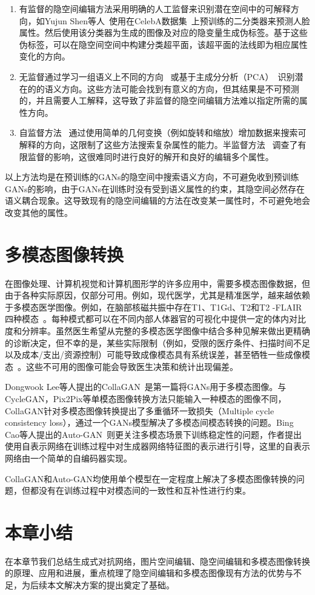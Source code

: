 \begin{enumerate}
\item 有监督的隐空间编辑方法采用明确的人工监督来识别潜在空间中的可解释方向，如Yujun Shen等人~\cite{interfacegan}使用在CelebA数据集~\cite{CelebA}上预训练的二分类器来预测人脸属性。然后使用该分类器为生成的图像及对应的隐变量生成伪标签。基于这些伪标签，可以在隐空间空间中构建分类超平面，该超平面的法线即为相应属性变化的方向。

\item 无监督通过学习一组语义上不同的方向~\cite{icml2020} 或基于主成分分析（PCA）~\cite{harkonen2020ganspace}识别潜在的的语义方向。这些方法可能会找到有意义的方向，但其结果是不可预测的，并且需要人工解释，这导致了非监督的隐空间编辑方法难以指定所需的属性方向。

\item 自监督方法~\cite{steer,variation} 通过使用简单的几何变换（例如旋转和缩放）增加数据来搜索可解释的方向，这限制了这些方法搜索复杂属性的能力。半监督方法~\cite{nie2020semi} 调查了有限监督的影响，这很难同时进行良好的解开和良好的编辑多个属性。
\end{enumerate}

以上方法均是在预训练的GANs的隐空间中搜索语义方向，不可避免收到预训练GANs的影响，由于GANs在训练时没有受到语义属性的约束，其隐空间必然存在语义耦合现象。这导致现有的隐空间编辑的方法在改变某一属性时，不可避免地会改变其他的属性。    

\section{多模态图像转换}

在图像处理、计算机视觉和计算机图形学的许多应用中，需要多模态图像数据，但由于各种实际原因，仅部分可用。例如，现代医学，尤其是精准医学，越来越依赖于多模态医学图像。例如，在脑部核磁共振中存在T1、T1Gd、T2和T2 -FLAIR四种模态~\cite{drevelegas2011imaging}。每种模式都可以在不同内部人体器官的可视化中提供一定的体内对比度和分辨率。虽然医生希望从完整的多模态医学图像中结合多种见解来做出更精确的诊断决定，但不幸的是，某些实际限制（例如，受限的医疗条件、扫描时间不足以及成本/支出/资源控制）可能导致成像模态具有系统误差，甚至牺牲一些成像模态~\cite{tanenbaum2017synthetic}。这些不可用的图像可能会导致医生决策和统计出现偏差。

Dongwook Lee等人提出的CollaGAN~\cite{collagan}是第一篇将GANs用于多模态图像。与CycleGAN，Pix2Pix等单模态图像转换方法只能输入一种模态的图像不同，CollaGAN针对多模态图像转换提出了多重循环一致损失（Multiple cycle consistency loss），通过一个GANs模型解决了多模态间模态转换的问题。Bing Cao等人提出的Auto-GAN~\cite{AutoGAN}则更关注多模态场景下训练稳定性的问题，作者提出使用自表示网络在训练过程中对生成器网络特征图的表示进行引导，这里的自表示网络由一个简单的自编码器实现。

CollaGAN和Auto-GAN均使用单个模型在一定程度上解决了多模态图像转换的问题，但都没有在训练过程中对模态间的一致性和互补性进行约束。

\section{本章小结}

在本章节我们总结生成式对抗网络，图片空间编辑、隐空间编辑和多模态图像转换的原理、应用和进展，重点梳理了隐空间编辑和多模态图像现有方法的优势与不足，为后续本文解决方案的提出奠定了基础。
